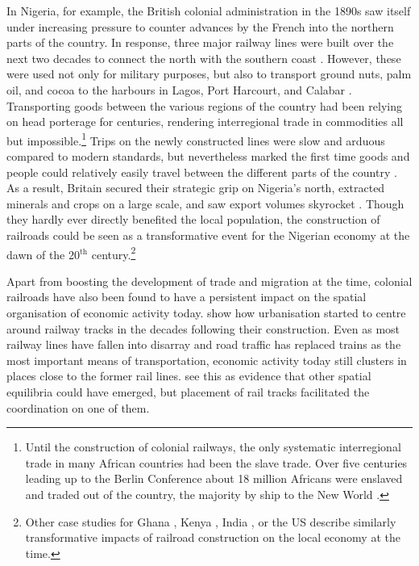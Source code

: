 \documentclass[11pt, oneside]{article}   	%
\begin{document}
In Nigeria, for example, the British colonial administration in the 1890s saw itself under increasing pressure to counter advances by the French into the northern parts of the country. In response, three major railway lines were built over the next two decades to connect the north with the southern coast \citep{Falola_historyNigeria_2008}. However, these were used not only for military purposes, but also to transport ground nuts, palm oil, and cocoa to the harbours in Lagos, Port Harcourt, and Calabar \citep{ekundare_economic_1973}. Transporting goods between the various regions of the country had been relying on head porterage for centuries, rendering interregional trade in commodities all but impossible.\footnote{Until the construction of colonial railways, the only systematic interregional trade in many African countries had been the slave trade. Over five centuries leading up to the Berlin Conference about 18 million Africans were enslaved and traded out of the country, the majority by ship to the New World \citep{nunn_long-term_2008}.} Trips on the newly constructed lines were slow and arduous compared to modern standards, but nevertheless marked the first time goods and people could relatively easily travel between the different parts of the country \citep{chaves_reinventing_2013}. As a result, Britain secured their strategic grip on Nigeria's north, extracted minerals and crops on a large scale, and saw export volumes skyrocket \citep{Falola_historyNigeria_2008,woltjer_economic_2018}. Though they hardly ever directly benefited the local population, the construction of railroads could be seen as a transformative event for the Nigerian economy at the dawn of the 20$^{\textrm{th}}$ century.\footnote{Other case studies for Ghana \citep{jedwab_permanent_2016}, Kenya \citep{jedwab_history_2017}, India \citep{Donaldson_RailroadsRajEstimating_2018}, or the US \citep{donaldson_railroads_2016,swisher_reassessing_2017} describe similarly transformative impacts of railroad construction on the local economy at the time.}

Apart from boosting the development of trade and migration at the time, colonial railroads have also been found to have a persistent impact on the spatial organisation of economic activity today. \cite{jedwab_permanent_2016} show how urbanisation started to centre around railway tracks in the decades following their construction. Even as most railway lines have fallen into disarray and road traffic has replaced trains as the most important means of transportation, economic activity today still clusters in places close to the former rail lines. \citeauthor{jedwab_permanent_2016} see this as evidence that other spatial equilibria could have emerged, but placement of rail tracks facilitated the coordination on one of them.
\end{document}
